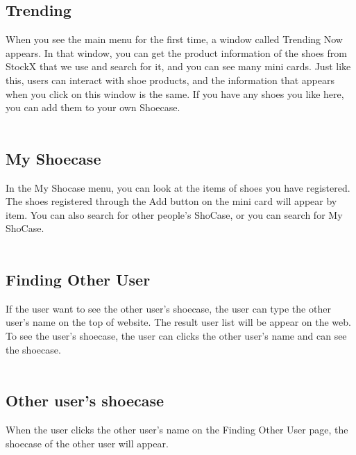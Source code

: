 \documentclass[conference]{IEEEtran}
\begin{document}
\begin{enumerate}
\subsection{Trending}
When you see the main menu for the first time, a window called Trending Now appears. In that window, you can get the product information of the shoes from StockX that we use and search for it, and you can see many mini cards. Just like this, users can interact with shoe products, and the information that appears when you click on this window is the same. If you have any shoes you like here, you can add them to your own Shoecase.\\\\
\subsection{My Shoecase}
In the My Shocase menu, you can look at the items of shoes you have registered. The shoes registered through the Add button on the mini card will appear by item. You can also search for other people's ShoCase, or you can search for My ShoCase.\\\\
\subsection{Finding Other User}
If the user want to see the other user's shoecase, the user can type the other user's name on the top of website. The result user list will be appear on the web. To see the user's shoecase, the user can clicks the other user's name and can see the shoecase.\\\\
\subsection{Other user's shoecase}
When the user clicks the other user's name on the Finding Other User page, the shoecase of the other user will appear.
\end{enumerate}
\end{document}
